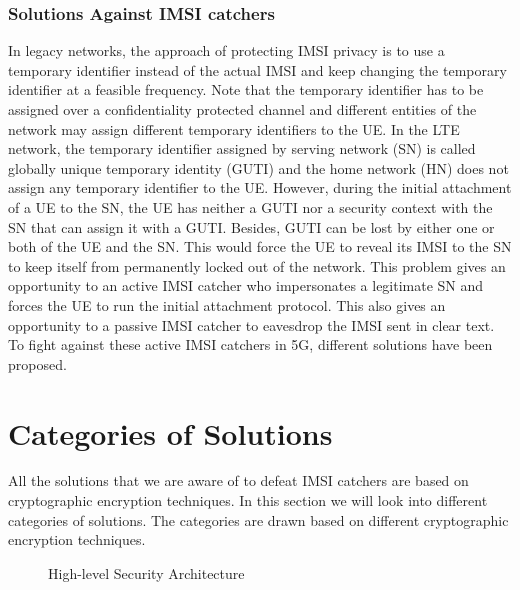 \documentclass[conference]{IEEEtran}
\begin{document}
\subsubsection{Solutions Against IMSI catchers}
In legacy networks, the approach of protecting IMSI privacy is to use a temporary identifier instead of the actual IMSI and keep changing the temporary identifier at a feasible frequency. Note that the temporary identifier has to be assigned over a confidentiality protected channel and different entities of the network may assign different temporary identifiers to the UE. In the LTE network, the temporary identifier assigned by serving network (SN) is called globally unique temporary identity (GUTI) \cite{TS23003} and the home network (HN) does not assign any temporary identifier to the UE. However, during the initial attachment of a UE to the SN, the UE has neither a GUTI nor a security context with the SN that can assign it with a GUTI. Besides, GUTI can be lost by either one or both of the UE and the SN. This would force the UE to reveal its IMSI to the SN to keep itself from permanently locked out of the network. This problem gives an opportunity to an active IMSI catcher who impersonates a legitimate SN and forces the UE to run the initial attachment protocol. This also gives an opportunity to a passive IMSI catcher to eavesdrop the IMSI sent in clear text. To fight against these active IMSI catchers in 5G, different solutions \cite{pseudonym_valtteri_philip, pseudonym_ericsson, CCS15, SSR15, wisec17, pseudonym_mohsin, ICTJournal, IBE_mohsin} have been proposed.

\section{Categories of Solutions} \label{section:categories}
All the solutions that we are aware of to defeat IMSI catchers are based on cryptographic encryption techniques. In this section we will look into different categories of solutions. The categories are drawn based on different cryptographic encryption techniques.

\begin{figure}
\begin{center}



\caption{High-level Security Architecture}
\label{fig:security_architecture_abstraction}       %
\end{center}
\end{figure}
\end{document}
